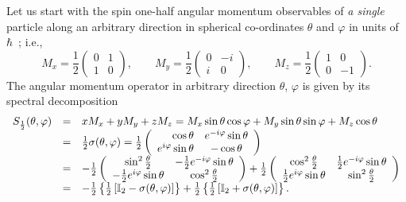 \documentclass[fleqn,twoside]{article}      %
\begin{document}
Let us start with the spin one-half angular momentum observables of {\em a single} particle along an arbitrary direction
in spherical co-ordinates $\theta$ and $\varphi$
in units of $\hbar$~\cite{schiff-55}; i.e.,
\begin{equation}
M_x=
\frac{1}{2}
\left(
\begin{array}{cccccccccc}
0&1\\
1&0
\end{array}
\right),
\qquad
M_y=
\frac{1}{2}
\left(
\begin{array}{cccccccccc}
0&-i\\
i&0
\end{array}
\right),
\qquad
M_z=
\frac{1}{2}
\left(
\begin{array}{cccccccccc}
1&0\\
0&-1
\end{array}
\right).
\end{equation}
The angular momentum operator in arbitrary direction $\theta$, $\varphi$ is given by its spectral decomposition
\begin{equation}
\begin{array}{rcl}
S_\frac{1}{2} (\theta ,\varphi) &=&
xM_x
+
yM_y
+
zM_z
=
 M_x  \sin \theta \cos \varphi
+
M_y   \sin \theta \sin \varphi
+
M_z   \cos \theta
\\
&=&   \frac{1}{2}\sigma (\theta ,\varphi)=
{1\over 2}
\left(\begin{array}{rcl}
\cos \theta &  e^{-i \varphi }\sin \theta \\
e^{i \varphi }\sin \theta & - \cos \theta
\end{array}
\right)\\
&=&
-
\frac{1}{2}
\left(
\begin{array}{cc}
 \sin ^2 \frac{\theta }{2} & -\frac{1}{2} e^{-i \varphi } \sin \theta  \\
 -\frac{1}{2} e^{i \varphi } \sin \theta  & \cos ^2\frac{\theta  }{2}
\end{array}
\right)
+
\frac{1}{2}
 \left(
\begin{array}{cc}
 \cos ^2 \frac{\theta }{2} & \frac{1}{2} e^{-i \varphi } \sin \theta  \\
 \frac{1}{2} e^{i \varphi } \sin \theta  & \sin ^2 \frac{\theta }{2}
\end{array}
\right)\\
&=&
-
\frac{1}{2}
\left\{
\frac{1}{2}
\left[
{\Bbb I}_2 - \sigma (\theta ,\varphi)
\right]
\right\}
+
\frac{1}{2}
\left\{
\frac{1}{2}
\left[
{\Bbb I}_2 + \sigma (\theta ,\varphi)
\right]
\right\}
.
\end{array}
\label{e-2009-gtq-s2}
\end{equation}
\end{document}
